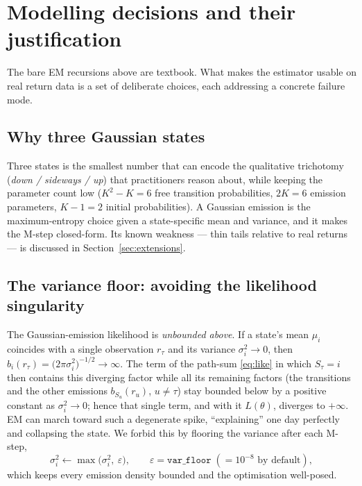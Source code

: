 \documentclass[11pt]{article}
\newcommand{\state}{S}
\newcommand{\obs}{r}
\newcommand{\nstate}{K}
\theoremstyle{plain}
\theoremstyle{definition}
\theoremstyle{remark}
\begin{document}
\section{Modelling decisions and their justification}\label{sec:decisions}

The bare EM recursions above are textbook. What makes the estimator usable on
real return data is a set of deliberate choices, each addressing a concrete
failure mode.

\subsection{Why three Gaussian states}
Three states is the smallest number that can encode the qualitative trichotomy
(\emph{down / sideways / up}) that practitioners reason about, while keeping the
parameter count low ($\nstate^2-\nstate=6$ free transition probabilities,
$2\nstate=6$ emission parameters, $\nstate-1=2$ initial probabilities). A
Gaussian emission is the maximum-entropy choice given a state-specific mean and
variance, and it makes the M-step closed-form. Its known weakness --- thin tails
relative to real returns --- is discussed in Section~\ref{sec:extensions}.

\subsection{The variance floor: avoiding the likelihood singularity}\label{sec:floor}
The Gaussian-emission likelihood is \emph{unbounded above}. If a state's mean
$\mu_i$ coincides with a single observation $\obs_\tau$ and its variance
$\sigma_i^2\to 0$, then $b_i(\obs_\tau)=\big(2\pi\sigma_i^2\big)^{-1/2}\to\infty$.
The term of the path-sum \eqref{eq:like} in which $\state_\tau=i$ then contains
this diverging factor while all its remaining factors (the transitions and the
other emissions $b_{\state_u}(\obs_u)$, $u\ne\tau$) stay bounded below by a
positive constant as $\sigma_i^2\to0$; hence that single term, and with it
$L(\theta)$, diverges to $+\infty$. EM can march toward such a degenerate spike,
``explaining'' one day perfectly and collapsing the state. We forbid this by
flooring the variance after each M-step,
\begin{equation}
  \sigma_i^2 \leftarrow \max\!\big(\sigma_i^2,\ \varepsilon\big),
  \qquad \varepsilon = \texttt{var\_floor} \;(=10^{-8}\text{ by default}),
\end{equation}
which keeps every emission density bounded and the optimisation well-posed.
\end{document}
